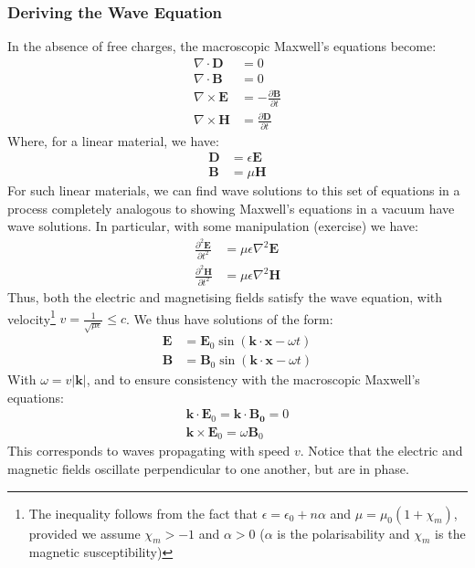 \documentclass[a4paper]{article}
\numberwithin{equation}{section}
\begin{document}
\subsubsection{Deriving the Wave Equation}
In the absence of free charges, the macroscopic Maxwell's equations become:
\begin{align}
\nabla \cdot \mathbf{D} &= 0 \\
\nabla \cdot \mathbf{B} &= 0 \\
\nabla \times \mathbf{E} &= -\frac{\partial \mathbf{B}}{\partial t} \\
\nabla \times \mathbf{H} &= \frac{\partial \mathbf{D}}{\partial t}
\end{align}
Where, for a linear material, we have:
\begin{align}
\mathbf{D} &= \epsilon \mathbf{E} \\
\mathbf{B} &= \mu \mathbf{H}
\end{align}
For such linear materials, we can find wave solutions to this set of equations in a process completely analogous to showing Maxwell's equations in a vacuum have wave solutions. In particular, with some manipulation (exercise) we have:
\begin{align}
\frac{\partial^2 \mathbf{E}}{\partial t^2} &= \mu \epsilon \nabla^2 \mathbf{E} \\
\frac{\partial^2 \mathbf{H}}{\partial t^2} &= \mu \epsilon \nabla^2 \mathbf{H}
\end{align}
Thus, both the electric and magnetising fields satisfy the wave equation, with velocity\footnote{The inequality follows from the fact that $\epsilon = \epsilon_0 + n \alpha$ and $\mu=\mu_0(1+\chi_m)$, provided we assume $\chi_m>-1$ and $\alpha>0$ ($\alpha$ is the polarisability and $\chi_m$ is the magnetic susceptibility)}  $v=\frac{1}{\sqrt{\mu \epsilon}} \leq c$. We thus have solutions of the form:
\begin{align}
\mathbf{E}&=\mathbf{E}_0 \sin (\mathbf{k} \cdot \mathbf{x} - \omega t) \label{Ewave} \\
\mathbf{B}&=\mathbf{B}_0 \sin(\mathbf{k} \cdot \mathbf{x} - \omega t) \label{Bwave}
\end{align}
With $\omega = v |\mathbf{k}|$, and to ensure consistency with the macroscopic Maxwell's equations:
\begin{align}
\mathbf{k} \cdot \mathbf{E}_0 = \mathbf{k} \cdot \mathbf{B_0} = 0 \\
\mathbf{k} \times \mathbf{E}_0 = \omega \mathbf{B}_0 
\end{align}
This corresponds to waves propagating with speed $v$. Notice that the electric and magnetic fields oscillate perpendicular to one another, but are in phase.\\
\end{document}
